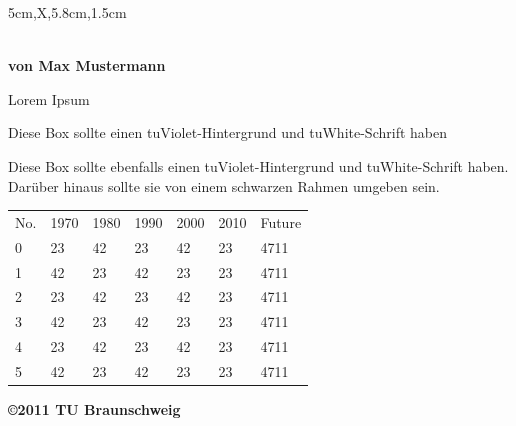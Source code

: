 \documentclass[a3paper,style=scifi,table,scifiposter]{tubsposter}
\begin{document}
\begin{modulepage}[sender=top,bgcolor=tuBlue]{5cm,X,5.8cm,1.5cm}
  \showtubslogo[right]
  \begin{posterrow}[bgcolor=tuOrangeDark80,fgcolor=tuWhite]
    \bfseries{}\\[1em]
    von Max Mustermann
  \end{posterrow}
  \begin{posterrow}[X,X]
    \begin{postercol}
      {Lorem Ipsum}\\[2ex]
      \lipsum[1-2]
    \end{postercol}
    \begin{postercol}[bgcolor=tuViolet,fgcolor=tuWhite,X,X]
      \begin{postersubrow}
        Diese Box sollte einen tuViolet-Hintergrund und tuWhite-Schrift haben
      \end{postersubrow}
      \begin{postersubrow}[frame=fbox]
        Diese Box sollte ebenfalls einen tuViolet-Hintergrund und tuWhite-Schrift haben.\\
        Darüber hinaus sollte sie von einem schwarzen Rahmen umgeben sein.
      \end{postersubrow}
    \end{postercol}
  \end{posterrow}
  \begin{modrow*}
    \large
     
    \begin{tabularx}{\textwidth}{lXXXXXX}
      \rowcolor{tuGray20}
      No. & 1970 & 1980 & 1990 & 2000 & 2010 & Future \\
      0   & 23   & 42   & 23   & 42   & 23   & 4711 \\
      1   & 42   & 23   & 42   & 23   & 23   & 4711 \\
      2   & 23   & 42   & 23   & 42   & 23   & 4711 \\
      3   & 42   & 23   & 42   & 23   & 23   & 4711 \\
      4   & 23   & 42   & 23   & 42   & 23   & 4711 \\
      5   & 42   & 23   & 42   & 23   & 23   & 4711 \\
    \end{tabularx}
  \end{modrow*}
  \begin{modrow}[bgcolor=tuGreen]
    \bfseries\raggedleft\textcolor{tuWhite}{\copyright 2011 TU Braunschweig}
  \end{modrow}
\end{modulepage}
\end{document}
